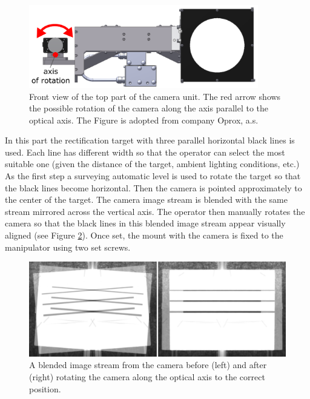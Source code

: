 \begin{figure}[htb]
	\centering
	\includegraphics[width=10cm]{fig/rect_model_front_view.png}
	\caption{Front view of the top part of the camera unit. The red arrow shows the possible rotation of the camera along the axis parallel to the optical axis. The Figure is adopted from company Oprox, a.s.}
	\label{fig:rect_model_front_view}
\end{figure}

In this part the rectification target with three parallel horizontal black lines is used. Each line has different width so that the operator can select the most suitable one (given the distance of the target, ambient lighting conditions, etc.) As the first step a surveying automatic level is used to rotate the target so that the black lines become horizontal. Then the camera is pointed approximately to the center of the target. The camera image stream is blended with the same stream mirrored across the vertical axis. The operator then manually rotates the camera so that the black lines in this blended image stream appear visually aligned (see Figure \ref{fig:rect_mirrored_stream}). Once set, the mount with the camera is fixed to the manipulator using two set screws.

\begin{figure}[htb]
	\centering
	\includegraphics[width=12cm]{fig/rect_mirrored_stream.png}
	\caption{A blended image stream from the camera before (left) and after (right) rotating the camera along the optical axis to the correct position.}
	\label{fig:rect_mirrored_stream}
\end{figure}

